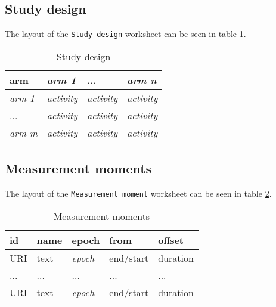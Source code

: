 \documentclass[a4paper,10pt]{article}
\begin{document}
\subsection*{Study design}
The layout of the \texttt{Study design} worksheet can be seen in table \ref{table:Study design}.
\begin{table}[!h]
  \centering
  \caption{Study design}
  \label{table:Study design}
  \begin{tabular}{|l|l|l|l|}
    \hline
    \textbf{arm}   & \textit{arm 1}    & ...               & \textit{arm n}    \\ \hline
    \textit{arm 1} & \textit{activity} & \textit{activity} & \textit{activity} \\ \hline
    ...            & \textit{activity} & \textit{activity} & \textit{activity} \\ \hline
    \textit{arm m} & \textit{activity} & \textit{activity} & \textit{activity} \\ \hline
  \end{tabular}
\end{table}

\subsection*{Measurement moments}
The layout of the \texttt{Measurement moment} worksheet can be seen in table \ref{table:Measurement moments}.
\begin{table}[!h]
  \centering
  \caption{Measurement moments}
  \label{table:Measurement moments}
  \begin{tabular}{|l|l|l|l|l|}
    \hline
    \textbf{id} & \textbf{name} & \textbf{epoch} & \textbf{from} & \textbf{offset} \\ \hline
    URI         & text          & \textit{epoch} & end/start     & duration        \\ \hline
    ...         & ...           & ...            &  ...          & ...             \\ \hline
    URI         & text          & \textit{epoch} & end/start     & duration        \\ \hline
  \end{tabular}
\end{table}
\end{document}
